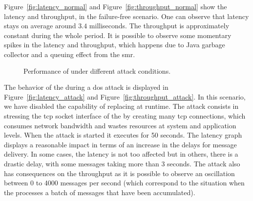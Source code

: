 Figure~\ref{fig:latency_normal} and Figure~\ref{fig:throughput_normal} show the latency and throughput, in the failure-free scenario.
One can observe that latency stays on average around $3.4$ milliseconds.
The throughput is approximately constant during the whole period.
It is possible to observe some momentary spikes in the latency and throughput, which happens due to Java garbage collector and a queuing effect from the \gls{smr}.

\begin{figure}[h]

\hspace{-5mm}
\caption{\small Performance of \sieveq under different attack conditions.}
\label{fig:performance_attacks}
\end{figure}



The behavior of the \sieveq during a \gls{dos} attack is displayed in Figure~\ref{fig:latency_attack} and Figure~\ref{fig:throughput_attack}.
In this scenario, we have disabled the \sieveq capability of replacing \presieves at runtime.
The attack consists in stressing the \gls{tcp} socket interface of the \presieves by creating many \gls{tcp} connections, which consumes network bandwidth and wastes resources at system and application levels. When the attack is started it executes for 50 seconds. The latency graph displays a reasonable impact in terms of an increase in the delays for message delivery. 
In some cases, the latency is not too affected but in others, there is a drastic delay, with some messages taking more than 3 seconds.
The attack also has consequences on the throughput as it is possible to observe an oscillation between 0 to 4000 messages per second (which correspond to the situation when the \postsieve processes a batch of messages that have been accumulated).

